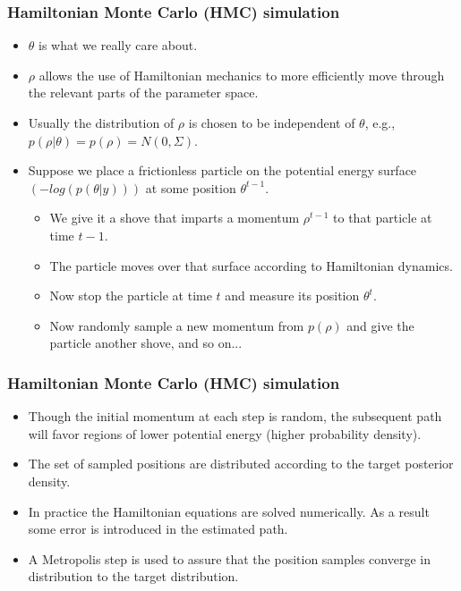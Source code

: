 \documentclass[handout]{beamer}
\begin{document}
\begin{frame}
  \frametitle{Hamiltonian Monte Carlo (HMC) simulation}
  
  \begin{itemize}
  \item $\theta$ is what we really care about.
  \item $\rho$ allows the use of Hamiltonian mechanics to more
    efficiently move through the relevant parts of the parameter
    space.
  \item Usually the distribution of $\rho$ is chosen to be independent of
    $\theta$, e.g.,
    $p(\rho | \theta) = p(\rho) = N\left(0, \Sigma\right)$.
  \item Suppose we place a frictionless particle on the potential
    energy surface $\left(-log\left(p\left(\theta |
          y\right)\right)\right)$ at some position $\theta^{t-1}$.
    \begin{itemize}
    \item We give it a shove that imparts a momentum $\rho^{t-1}$ to that
      particle at time $t-1$.
    \item The particle moves over that surface according to
      Hamiltonian dynamics.
    \item Now stop the particle at time $t$ and measure its
      position $\theta^t$.
    \item Now randomly sample a new momentum from $p(\rho)$ and give
      the particle another shove, and so on...
    \end{itemize}
  \end{itemize}

\end{frame}

\begin{frame}
  \frametitle{Hamiltonian Monte Carlo (HMC) simulation}
  
  \begin{itemize}
  \item Though the initial momentum at each step is random, the
    subsequent path will favor regions of lower potential energy
    (higher probability density).
  \item The set of sampled positions are distributed according to the
    target posterior density.
  \item In practice the Hamiltonian equations are solved
    numerically. As a result some error is introduced in the estimated
    path.
  \item A Metropolis step is used to assure that the position samples
    converge in distribution to the target distribution.
  \end{itemize}

\end{frame}
\end{document}
